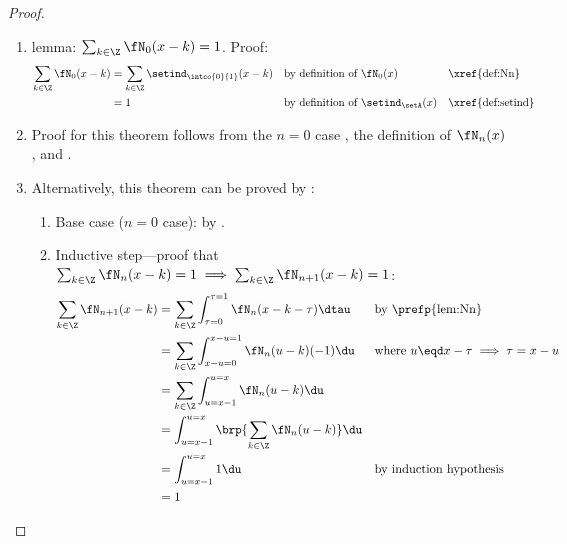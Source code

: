\begin{proof}
    \begin{enumerate}
      \item lemma: $\sum_{k\in\Z}\fN_0(x-k)=1$. Proof: \label{ilem:bspline_punity_n0}\\
        \begin{align*}
          \sum_{k\in\Z}\fN_0(x-k)
            &= \sum_{k\in\Z} \setind_\intco{0}{1}(x-k)
            && \text{by definition of $\fN_0(x)$} 
            && \text{\xref{def:Nn}}
          \\&= 1
            && \text{by definition of $\setind_\setA(x)$} 
            && \text{\xref{def:setind}}
        \end{align*} 
      
      \item Proof for this theorem follows from the $n=0$ case ,
            the definition of $\fN_n(x)$ ,  and .

      \item Alternatively, this theorem can be proved by :
        \begin{enumerate}
          \item Base case ($n=0$ case): by .
          \item Inductive step---proof that $\sum_{k\in\Z}\fN_n(x-k)=1 \implies \sum_{k\in\Z}\fN_{n+1}(x-k)=1$:
            \begin{align*}
              \sum_{k\in\Z}\fN_{n+1}(x-k)
                &= \sum_{k\in\Z}\int_{\tau=0}^{\tau=1}\fN_{n}(x-k-\tau)\dtau
                && \text{by \prefp{lem:Nn}}
              \\&= \sum_{k\in\Z}\int_{x-u=0}^{x-u=1}\fN_{n}(u-k)(-1)\du
                && \text{where $u\eqd x-\tau \implies \tau=x-u$}
              \\&= \sum_{k\in\Z}\int_{u=x-1}^{u=x}\fN_{n}(u-k)\du
              \\&= \int_{u=x-1}^{u=x}\brp{\sum_{k\in\Z}\fN_{n}(u-k)}\du
              \\&= \int_{u=x-1}^{u=x}1\du
                && \text{by induction hypothesis}
              \\&= 1
            \end{align*}
        \end{enumerate}
    \end{enumerate}
\end{proof}

